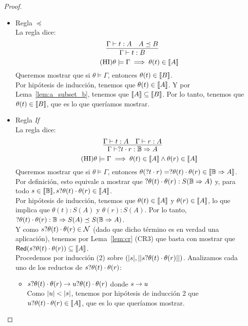 \begin{proof}
\begin{itemize}
    \item Regla \( \preceq \)
    \\ La regla dice:
    \[ \infer{\Gamma \vdash t : B}{\Gamma \vdash t: A & A \preceq B} \]
    \[
      \tag{HI}
      \theta \models \Gamma \implies \theta(t) \in \llbracket A\rrbracket
    \]
    Queremos mostrar que si \( \theta \models \Gamma \), entonces \( \theta(t) \in \llbracket B\rrbracket \).
    \\ Por hipótesis de inducción, tenemos que \( \theta(t) \in \llbracket A\rrbracket \). Y por Lema~\ref{lem:a_subset_b}, tenemos que \( \llbracket A\rrbracket \subseteq \llbracket B\rrbracket \). Por lo tanto, tenemos que \( \theta(t) \in \llbracket B\rrbracket \), que es lo que queríamos mostrar.

    \item Regla \textit{If}
    \\ La regla dice:
    \[ \infer{\Gamma \vdash \ifte{}{t}{r}: \qubittype \Rightarrow A}{\Gamma \vdash t : A & \Gamma \vdash r : A} \]
    \[
      \tag{HI}
      \theta \models \Gamma \implies \theta(t) \in \llbracket A\rrbracket \land \theta(r) \in \llbracket A\rrbracket
    \]
    Queremos mostrar que si \( \theta \models \Gamma \), entonces \( \theta(? t \cdot r) = ? \theta(t) \cdot \theta(r) \in \llbracket\mathbb{B} \Rightarrow A\rrbracket \). Por definición, esto equivale a mostrar que \( ? \theta(t) \cdot \theta(r) : S(\mathbb{B} \Rightarrow A) \) y, para todo \( s \in \llbracket\mathbb{B}\rrbracket, s? \theta(t) \cdot \theta(r) \in \llbracket A\rrbracket \).
    \\ Por hipótesis de inducción, tenemos que \( \theta(t) \in \llbracket A\rrbracket \) y \( \theta(r) \in \llbracket A\rrbracket \), lo que implica que \( \theta(t) : S(A) \) y \( \theta(r) : S(A) \). Por lo tanto, \( ? \theta(t) \cdot \theta(r) : \mathbb{B} \Rightarrow S(A) \preceq S(\mathbb{B} \Rightarrow A) \).
    \\ Y como \( s? \theta(t) \cdot \theta(r) \in \mathcal{N} \) (dado que dicho término es en verdad una aplicación), tenemos por Lema~\ref{lem:cr} (CR3) que basta con mostrar que \( \mathsf{Red} (s? \theta(t) \cdot \theta(r)) \subseteq \llbracket A\rrbracket \).
    \\ Procedemos por inducción (2) sobre \( (|s|, ||s? \theta(t) \cdot \theta(r)||) \). Analizamos cada uno de los reductos de \( s? \theta(t) \cdot \theta(r) \):
    \begin{itemize}
      \item \( s? \theta(t) \cdot \theta(r) \rightarrow u? \theta(t) \cdot \theta(r) \) donde \( s \rightarrow u \)
        \\ Como \( |u| < |s| \), tenemos por hipótesis de inducción 2 que \( u? \theta(t) \cdot \theta(r)  \in \llbracket A\rrbracket \), que es lo que queríamos mostrar.

\end{itemize}
\end{itemize}
\end{proof}
